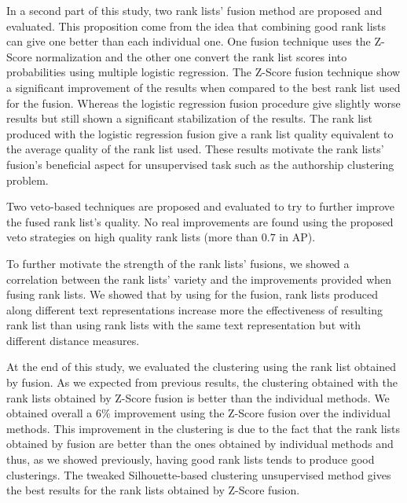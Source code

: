 In a second part of this study, two rank lists' fusion method are proposed and evaluated.
This proposition come from the idea that combining good rank lists can give one better than each individual one.
One fusion technique uses the Z-Score normalization and the other one convert the rank list scores into probabilities using multiple logistic regression.
The Z-Score fusion technique show a significant improvement of the results when compared to the best rank list used for the fusion.
Whereas the logistic regression fusion procedure give slightly worse results but still shown a significant stabilization of the results.
The rank list produced with the logistic regression fusion give a rank list quality equivalent to the average quality of the rank list used.
These results motivate the rank lists' fusion's beneficial aspect for unsupervised task such as the authorship clustering problem.

Two veto-based techniques are proposed and evaluated to try to further improve the fused rank list's quality.
No real improvements are found using the proposed veto strategies on high quality rank lists (more than $0.7$ in AP).

To further motivate the strength of the rank lists' fusions, we showed a correlation between the rank lists' variety and the improvements provided when fusing rank lists.
We showed that by using for the fusion, rank lists produced along different text representations increase more the effectiveness of resulting rank list than using rank lists with the same text representation but with different distance measures.

At the end of this study, we evaluated the clustering using the rank list obtained by fusion.
As we expected from previous results, the clustering obtained with the rank lists obtained by Z-Score fusion is better than the individual methods.
We obtained overall a $6\%$ improvement using the Z-Score fusion over the individual methods.
This improvement in the clustering is due to the fact that the rank lists obtained by fusion are better than the ones obtained by individual methods and thus, as we showed previously, having good rank lists tends to produce good clusterings.
The tweaked Silhouette-based clustering unsupervised method gives the best results for the rank lists obtained by Z-Score fusion.


